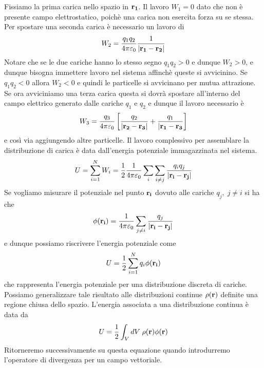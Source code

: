 Fissiamo la prima carica nello spazio in $\bold{r_1}$. Il lavoro $W_1 =0$ dato che non \`e presente campo elettrostatico, poich\`e una carica non esercita forza su se stessa. Per spostare una seconda carica \`e necessario un lavoro di 
\begin{equation*}
	W_2 = \frac{q_1q_2}{4 \pi \varepsilon_0} \frac{1}{|\bold{r_1} - \bold{r_2}|}
\end{equation*}
Notare che se le due cariche hanno lo stesso segno $q_1q_2 > 0$ e dunque $W_2 > 0$, e dunque bisogna immettere lavoro nel sistema affinch\`e queste si avvicinino. Se $q_1q_2 < 0$ allora $W_2 < 0$ e quindi le particelle si avvicinano per mutua attrazione.
\\
Se ora avviciniamo una terza carica questa si dovr\`a spostare all'interno del campo elettrico generato dalle cariche $q_1$ e $q_2$ e dunque il lavoro necessario \`e 
\begin{equation*}
	W_3 = \frac{q_3}{4 \pi \varepsilon_0} \left [  \frac{q_2}{|\bold{r_2} - \bold{r_3}|} + \frac{q_1}{|\bold{r_1}-\bold{r_3}}\right ] 
\end{equation*}
e cos\`i via aggiungendo altre particelle. Il lavoro complessivo per assemblare la distribuzione di carica \`e data dall'energia potenziale immagazzinata nel sistema.
\begin{equation}
	U = \sum_{i=1}^NW_i = \frac{1}{2}\frac{1}{4 \pi \varepsilon_0}\sum_{i}\sum_{i\neq j} \frac{q_iq_j}{|\bold{r_i}-\bold{r_j}|}
\end{equation}
Se vogliamo misurare il potenziale nel punto $\bold{r_i}$ dovuto alle cariche $q_j,\;j\neq i$ si ha che
\begin{equation*}
	\phi(\bold{r_i}) = \frac{1}{4 \pi \varepsilon_0} \sum_{j \neq i} \frac{q_j}{|\bold{r_i}-\bold{r_j}|}
\end{equation*} 
e dunque possiamo riscrivere l'energia potenziale come 
\begin{equation}
	U = \frac{1}{2}\sum_{i=1}^Nq_i \phi(\bold{r_i})
\end{equation}
che rappresenta l'energia potenziale per una distribuzione discreta di cariche. Possiamo generalizzare tale risultato alle distribuzioni continue $\rho(\bold{r})$ definite una regione chiusa dello spazio. L'energia associata a una distribuzione continua \`e data da 
\begin{equation}
	U = \frac{1}{2} \int_V dV \; \rho(\bold{r})\phi(\bold{r})
\end{equation}
Ritorneremo successivamente su questa equazione quando introdurremo l'operatore di divergenza per un campo vettoriale.

